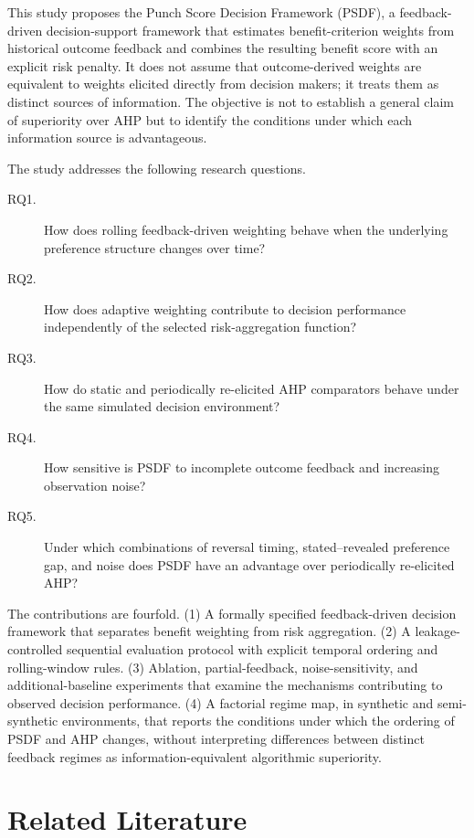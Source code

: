 \documentclass[12pt,a4paper]{article}
\begin{document}
This study proposes the Punch Score Decision Framework (PSDF), a feedback-driven decision-support framework that estimates benefit-criterion weights from historical outcome feedback and combines the resulting benefit score with an explicit risk penalty. It does not assume that outcome-derived weights are equivalent to weights elicited directly from decision makers; it treats them as distinct sources of information. The objective is not to establish a general claim of superiority over AHP but to identify the conditions under which each information source is advantageous.

The study addresses the following research questions.
\begin{description}
\item[RQ1.] How does rolling feedback-driven weighting behave when the underlying preference structure changes over time?
\item[RQ2.] How does adaptive weighting contribute to decision performance independently of the selected risk-aggregation function?
\item[RQ3.] How do static and periodically re-elicited AHP comparators behave under the same simulated decision environment?
\item[RQ4.] How sensitive is PSDF to incomplete outcome feedback and increasing observation noise?
\item[RQ5.] Under which combinations of reversal timing, stated--revealed preference gap, and noise does PSDF have an advantage over periodically re-elicited AHP?
\end{description}

The contributions are fourfold. (1) A formally specified feedback-driven decision framework that separates benefit weighting from risk aggregation. (2) A leakage-controlled sequential evaluation protocol with explicit temporal ordering and rolling-window rules. (3) Ablation, partial-feedback, noise-sensitivity, and additional-baseline experiments that examine the mechanisms contributing to observed decision performance. (4) A factorial regime map, in synthetic and semi-synthetic environments, that reports the conditions under which the ordering of PSDF and AHP changes, without interpreting differences between distinct feedback regimes as information-equivalent algorithmic superiority.

\section{Related Literature}
\end{document}
